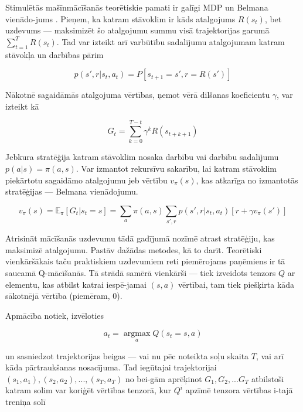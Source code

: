 \documentclass[12pt, a4paper]{article}
\numberwithin{equation}{section} %
\begin{document}
Stimulētās mašīnmācīšanās teorētiskie pamati ir galīgi MDP un Belmana vienādo-jums \cite{sutton2018reinforcement}. Pieņem, ka katram stāvoklim ir kāds atalgojums $R(s_t)$, bet uzdevums --- maksimizēt šo atalgojumu summu visā trajektorijas garumā $\sum_{t=1}^T R(s_t)$. Tad var izteikt arī varbūtību sadalījumu atalgojumam katram stāvokļa un darbības pārim

\begin{equation}
    p(s', r \vert s_t, a_t) = P[s_{t+1}=s', r=R(s')]
\end{equation}

Nākotnē sagaidāmās atalgojuma vērtības, ņemot vērā dilšanas koeficientu $\gamma$,  var izteikt kā

\begin{equation}
    G_t = \sum_{k=0}^{T-t} \gamma^k R(s_{t+k+1})
\end{equation}

Jebkura stratēģija katram stāvoklim nosaka darbību vai darbību sadalījumu $p(a \vert s) = \pi(a,s)$. Var izmantot rekursīvu sakarību, lai katram stāvoklim piekārtotu sagaidāmo atalgojumu jeb vērtību $v_{\pi}(s)$, kas atkarīga no izmantotās stratēģijas --- Belmana vienādojumu.

\begin{equation}
    v_{\pi}(s) = \mathbb{E}_{\pi}[G_t \vert s_t = s] = \sum_{a}\pi(a,s)\sum_{s', r}p(s', r \vert s_t, a_t)[r + \gamma v_{\pi}(s')]
\end{equation}

Atrisināt mācīšanās uzdevumu tādā gadījumā nozīmē atrast stratēģiju, kas maksimizē atalgojumu. Pastāv dažādas metodes, kā to darīt. Teorētiski vienkāršākais taču praktiskiem uzdevumiem reti piemērojams paņēmiens ir tā saucamā Q-mācīšanās. Tā strādā samērā vienkārši --- tiek izveidots tenzors $Q$ ar elementu, kas atbilst katrai iespē-jamai $(s,a)$ vērtībai, tam tiek piešķirta kāda sākotnējā vērtība (piemēram, 0). 

Apmācība notiek, izvēloties

\begin{equation}
    a_t = \operatorname*{argmax}_a Q(s_t = s, a)
\end{equation}

un sasniedzot trajektorijas beigas --- vai nu pēc noteikta soļu skaita $T$, vai arī kāda pārtraukšanas nosacījuma. Tad iegūtajai trajektorijai $(s_1, a_1), (s_2, a_2), ..., (s_T, a_T)$ no bei-gām aprēķinot $G_1, G_2, ... G_T$ atbilstoši katram solim var koriģēt vērtības tenzorā, kur $Q^i$ apzīmē tenzora vērtības i-tajā treniņa solī
\end{document}
